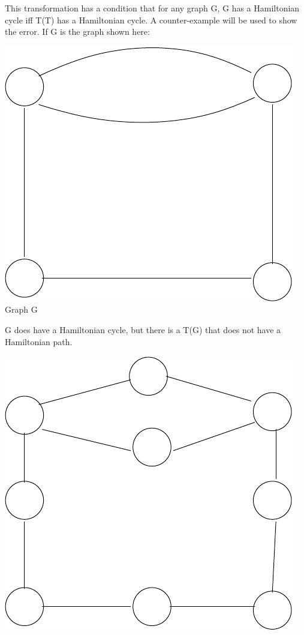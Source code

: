 \documentclass[11pt]{article}
\begin{document}
\begin{enumerate}
	This transformation has a condition that for any graph G, G has a Hamiltonian cycle iff T(T) has a Hamiltonian cycle. A
	counter-example will be used to show the error. If G is the graph shown here:
	\begin{center}
	  \includegraphics[scale=.4] {fig1.pdf} \\
	  Graph G
	\end{center}
	G does have a Hamiltonian cycle, but there is a T(G) that does not have a Hamiltonian path.
	\begin{center}
	  \includegraphics[scale=.4] {fig2.pdf} \\

\end{center}
\end{enumerate}
\end{document}
